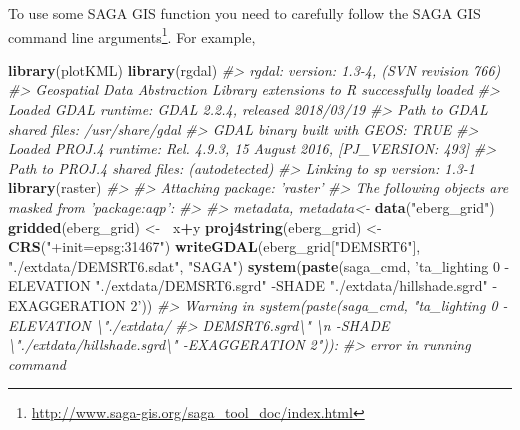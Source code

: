 \documentclass[11pt]{krantz}
\newenvironment{Shaded}{\begin{snugshade}}{\end{snugshade}}
\newcommand{\CommentTok}[1]{\textcolor[rgb]{0.37,0.37,0.37}{\textit{#1}}}
\newcommand{\ErrorTok}[1]{\textcolor[rgb]{0.14,0.14,0.14}{\textbf{#1}}}
\newcommand{\KeywordTok}[1]{\textcolor[rgb]{0.27,0.27,0.27}{\textbf{#1}}}
\newcommand{\NormalTok}[1]{#1}
\newcommand{\OperatorTok}[1]{\textcolor[rgb]{0.43,0.43,0.43}{\textbf{#1}}}
\newcommand{\StringTok}[1]{\textcolor[rgb]{0.5,0.5,0.5}{#1}}
\renewcommand{\href}[2]{#2\footnote{\url{#1}}}
\theoremstyle{definition}
\theoremstyle{definition}
\theoremstyle{definition}
\theoremstyle{remark}
\begin{document}
To use some SAGA GIS function you need to carefully follow the
\href{http://www.saga-gis.org/saga_tool_doc/index.html}{SAGA GIS command
line arguments}. For example,

\begin{Shaded}
\begin{Highlighting}[]
\KeywordTok{library}\NormalTok{(plotKML)}
\KeywordTok{library}\NormalTok{(rgdal)}
\CommentTok{#> rgdal: version: 1.3-4, (SVN revision 766)}
\CommentTok{#>  Geospatial Data Abstraction Library extensions to R successfully loaded}
\CommentTok{#>  Loaded GDAL runtime: GDAL 2.2.4, released 2018/03/19}
\CommentTok{#>  Path to GDAL shared files: /usr/share/gdal}
\CommentTok{#>  GDAL binary built with GEOS: TRUE }
\CommentTok{#>  Loaded PROJ.4 runtime: Rel. 4.9.3, 15 August 2016, [PJ_VERSION: 493]}
\CommentTok{#>  Path to PROJ.4 shared files: (autodetected)}
\CommentTok{#>  Linking to sp version: 1.3-1}
\KeywordTok{library}\NormalTok{(raster)}
\CommentTok{#> }
\CommentTok{#> Attaching package: 'raster'}
\CommentTok{#> The following objects are masked from 'package:aqp':}
\CommentTok{#> }
\CommentTok{#>     metadata, metadata<-}
\KeywordTok{data}\NormalTok{(}\StringTok{"eberg_grid"}\NormalTok{)}
\KeywordTok{gridded}\NormalTok{(eberg_grid) <-}\StringTok{ }\ErrorTok{~}\NormalTok{x}\OperatorTok{+}\NormalTok{y}
\KeywordTok{proj4string}\NormalTok{(eberg_grid) <-}\StringTok{ }\KeywordTok{CRS}\NormalTok{(}\StringTok{"+init=epsg:31467"}\NormalTok{)}
\KeywordTok{writeGDAL}\NormalTok{(eberg_grid[}\StringTok{"DEMSRT6"}\NormalTok{], }\StringTok{"./extdata/DEMSRT6.sdat"}\NormalTok{, }\StringTok{"SAGA"}\NormalTok{)}
\KeywordTok{system}\NormalTok{(}\KeywordTok{paste}\NormalTok{(saga_cmd, }\StringTok{'ta_lighting 0 -ELEVATION "./extdata/DEMSRT6.sgrd" }
\StringTok{             -SHADE "./extdata/hillshade.sgrd" -EXAGGERATION 2'}\NormalTok{))}
\CommentTok{#> Warning in system(paste(saga_cmd, "ta_lighting 0 -ELEVATION \textbackslash{}"./extdata/}
\CommentTok{#> DEMSRT6.sgrd\textbackslash{}" \textbackslash{}n -SHADE \textbackslash{}"./extdata/hillshade.sgrd\textbackslash{}" -EXAGGERATION 2")):}
\CommentTok{#> error in running command}
\end{Highlighting}
\end{Shaded}
\end{document}
